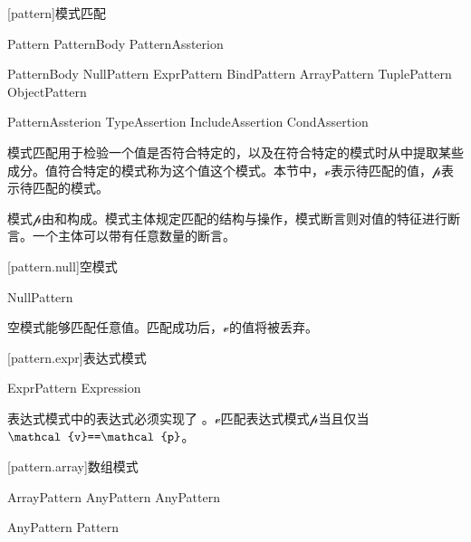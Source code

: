 
[pattern]{模式匹配}

\begin{bnf}{Pattern}
    PatternBody PatternAssterion\bnfs
\end{bnf}

\begin{bnf}{PatternBody}
    NullPattern \br
    ExprPattern \br
    BindPattern \br
    ArrayPattern \br
    TuplePattern \br
    ObjectPattern
\end{bnf}

\begin{bnf}{PatternAssterion}
    TypeAssertion \br
    IncludeAssertion \br
    CondAssertion
\end{bnf}

\pnum
模式匹配用于检验一个值是否符合特定的，以及在符合特定的模式时从中提取某些成分。值符合特定的模式称为这个值这个模式。本节中，$\mathcal{v}$表示待匹配的值，$\mathcal{p}$表示待匹配的模式。

\pnum
模式$\mathcal{p}$由和构成。模式主体规定匹配的结构与操作，模式断言则对值的特征进行断言。一个主体可以带有任意数量的断言。

[pattern.null]{空模式}

\begin{bnf}{NullPattern}
    \tcode{_}
\end{bnf}

\pnum
空模式能够匹配任意值。匹配成功后，$\mathcal{v}$的值将被丢弃。

[pattern.expr]{表达式模式}

\begin{bnf}{ExprPattern}
    Expression
\end{bnf}

\pnum
表达式模式中的表达式必须实现了 。$\mathcal{v}$匹配表达式模式$\mathcal{p}$当且仅当$\mathcal{v}\tcode{==}\mathcal{p}$。

[pattern.array]{数组模式}

\begin{bnf}{ArrayPattern}
    \terminal{[} AnyPattern \bnflp\terminal{,} AnyPattern\bnfrp\bnfs\ \terminal{]}
\end{bnf}

\begin{bnf}{AnyPattern}
    Pattern\br
\end{bnf}

